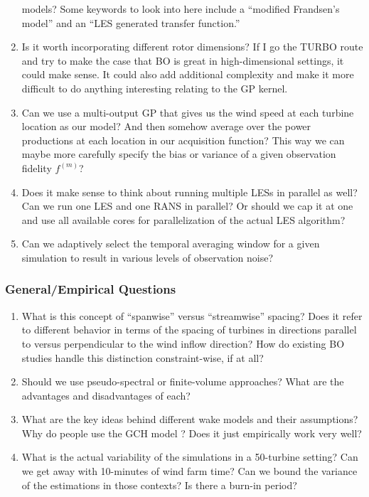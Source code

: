 \documentclass[12pt]{article}
\begin{document}
\begin{enumerate}
        models? Some keywords to look into here include a ``modified Frandsen's model''
        and an ``LES generated transfer function.''
    \item Is it worth incorporating different rotor dimensions? If I go the TURBO route
        and try to make the case that BO is great in high-dimensional settings, it could
        make sense. It could also add additional complexity and make it more difficult
        to do anything interesting relating to the GP kernel.
    \item Can we use a multi-output GP that gives us the wind speed at each turbine location
        as our model? And then somehow average over the power productions at each location
        in our acquisition function? This way we can maybe more carefully specify the bias
        or variance of a given observation fidelity $f^{(m)}$?
    \item Does it make sense to think about running multiple LESs in parallel
        as well? Can we run one LES and one RANS in parallel? Or should we cap
        it at one and use all available cores for parallelization of the actual LES
        algorithm?
    \item Can we adaptively select the temporal averaging window for a given simulation
        to result in various levels of observation noise?
\end{enumerate}

\subsubsection{General/Empirical Questions}
\begin{enumerate}
    \item What is this concept of ``spanwise'' versus ``streamwise'' spacing?
        Does it refer to different behavior in terms of the spacing of turbines
        in directions parallel to versus perpendicular to the wind inflow
        direction? How do existing BO studies handle this distinction
        constraint-wise, if at all?
    \item Should we use pseudo-spectral or finite-volume approaches? What are the advantages
        and disadvantages of each?
    \item What are the key ideas behind different wake models and their assumptions? Why do
        people use the GCH model \cite{niayifarAnalyticalModelingWind2016}? Does it just empirically
        work very well?
    \item What is the actual variability of the simulations in a 50-turbine setting? Can we get
        away with 10-minutes of wind farm time? Can we bound the variance of the estimations in those contexts?
        Is there a burn-in period?
\end{enumerate}
\end{document}
